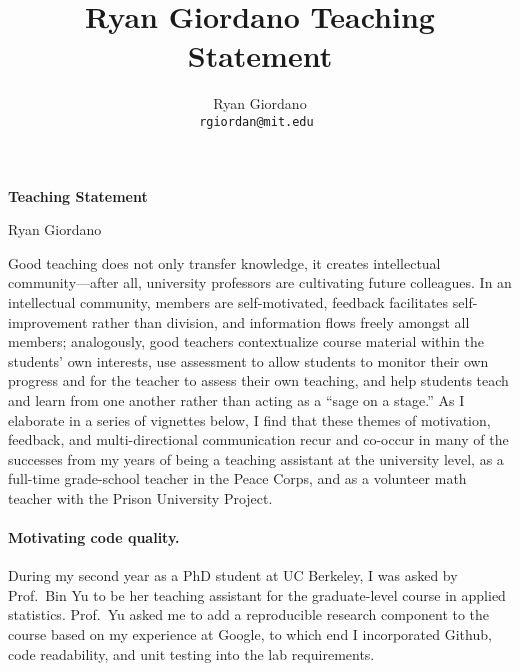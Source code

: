 

\usepackage{enumitem}

\usepackage{geometry}
\geometry{top=0.9in}
\geometry{left=1.2in}
\geometry{right=1.2in}


\title{Ryan Giordano Teaching Statement}

\author{
  Ryan Giordano \\ \texttt{rgiordan@mit.edu }
}




\begin{minipage}[t]{0.5\textwidth}
\hspace{-2em} %
{\bf \LARGE Teaching Statement}\\
\end{minipage}
\begin{minipage}[t]{0.5\textwidth}
        \hspace{8em} %
        {\LARGE Ryan Giordano}
\end{minipage}

Good teaching does not only transfer knowledge, it creates intellectual
community---after all, university professors are cultivating future colleagues.
In an intellectual community, members are self-motivated, feedback facilitates
self-improvement rather than division, and information flows freely amongst all
members; analogously, good teachers contextualize course material within the
students' own interests, use assessment to allow students to monitor their own
progress and for the teacher to assess their own teaching, and help students
teach and learn from one another rather than acting as a ``sage on a stage.'' As
I elaborate in a series of vignettes below, I find that these themes of
motivation, feedback, and multi-directional communication recur and co-occur in
many of the successes from my years of being a teaching assistant at the
university level, as a full-time grade-school teacher in the Peace Corps, and as
a volunteer math teacher with the Prison University Project.

\paragraph{Motivating code quality.}
%
During my second year as a PhD student at UC Berkeley, I was asked by Prof.\ Bin
Yu to be her teaching assistant for the graduate-level course in applied
statistics.
Prof.\ Yu asked me to add a reproducible research component to the course based
on my experience at Google, to which end I incorporated Github, code
readability, and unit testing into the lab requirements.

